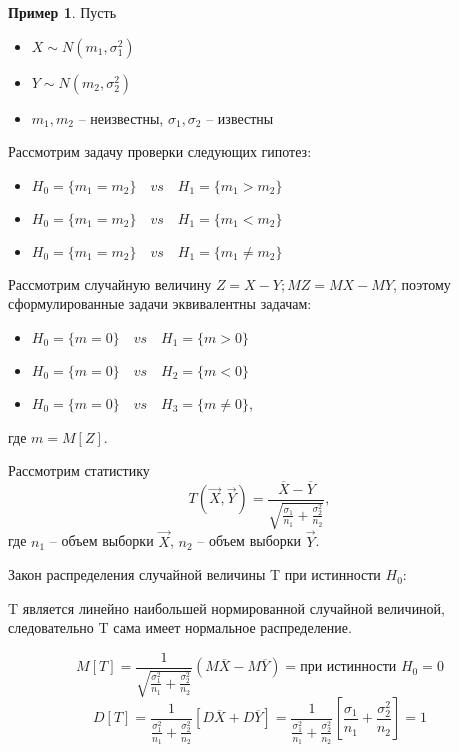 \documentclass[a4paper, 12pt]{article}
\theoremstyle{definition}
\theoremstyle{leads}
\theoremstyle{example}
\newtheorem{example}{Пример}
\theoremstyle{remark}
\begin{document}
\begin{example}
	Пусть 
	\begin{itemize}
		\item $X \sim N(m_1, \sigma_1^2)$
		\item $Y \sim N(m_2, \sigma_2^2)$
		\item $m_1, m_2$ -- неизвестны, $\sigma_1, \sigma_2$ -- известны
	\end{itemize}

Рассмотрим задачу проверки следующих гипотез:

\begin{itemize}
	\item $H_0 = \{m_1 = m_2\} \quad vs \quad H_1 = \{m_1 > m_2\}$
	\item $H_0 = \{m_1 = m_2\} \quad vs \quad H_1 = \{m_1 < m_2\}$
	\item $H_0 = \{m_1 = m_2\} \quad vs \quad H_1 = \{m_1 \neq m_2\}$ 
\end{itemize}

Рассмотрим случайную величину $Z = X - Y; MZ = MX - MY$, поэтому сформулированные задачи эквивалентны задачам:
\begin{itemize}
	\item $H_0 = \{m = 0\} \quad vs \quad H_1 = \{m > 0\}$
	\item $H_0 = \{m = 0\} \quad vs \quad H_2 = \{m < 0\}$
	\item $H_0 = \{m = 0\} \quad vs \quad H_3 = \{m \neq 0\}$, 
\end{itemize}
где $m = M[Z]$.

 Рассмотрим статистику 
 \begin{equation*}
 	T(\vec{X}, \vec{Y}) = \frac{\overline{X} - \overline{Y}}{\sqrt{\frac{\sigma_1}{n_1} + \frac{\sigma_2^2}{n_2}}},
 \end{equation*}
 где $n_1$ -- объем выборки $\vec{X}$, $n_2 $ -- объем выборки $\vec{Y}$.
 
 Закон распределения случайной величины T при истинности $H_0$:
 
 T является линейно наибольшей нормированной случайной величиной, следовательно T сама имеет нормальное распределение.
 
 \begin{equation*}
 	M[T] = \frac{1}{\sqrt{\frac{\sigma_1^2}{n_1} + \frac{\sigma_2^2}{n_2}}}(M\overline{X} - M\overline{Y}) = \text{при истинности } H_0 = 0
 \end{equation*}
 \begin{equation*}
 	D[T] = \frac{1}{\frac{\sigma_1^2}{n_1} + \frac{\sigma_2^2}{n_2}} [D\overline{X} + D\overline{Y}] = \frac{1}{\frac{\sigma_1^2}{n_1} + \frac{\sigma_2^2}{n_2}}[\frac{\sigma_1}{n_1} + \frac{\sigma_2^2}{n_2}] = 1
 \end{equation*}
 

\end{example}
\end{document}
